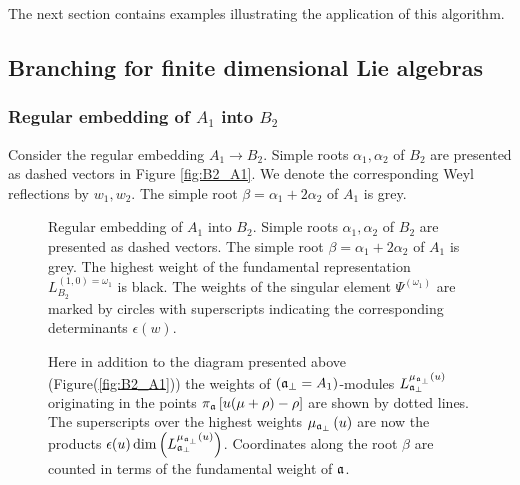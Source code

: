 The next section contains examples illustrating the application of this
algorithm.

\subsection{Branching for finite dimensional Lie algebras}
\label{sec:finite-dimens-lie}

\subsubsection{Regular embedding of $A_1$ into $B_2$}
\label{sec:regul-embedd-a_1}

Consider the regular embedding $A_1\to B_2$. Simple roots $\alpha_1, \alpha_2$ of $B_2$
are presented as dashed vectors in Figure \ref{fig:B2_A1}. We denote the corresponding
Weyl reflections by $w_1, w_2$. The simple root $\beta = \alpha_1+2\alpha_2$ of $A_1$ is
grey.


\begin{figure}[p]
  \noindent{}
  \caption{Regular embedding of $A_1$ into $B_2$. Simple roots $\alpha_1, \alpha_2$ of $B_2$
  are presented as dashed vectors.
  The simple root $\beta = \alpha_1+2\alpha_2$ of $A_1$ is grey.
  The highest weight of the fundamental representation $L^{(1,0)=\omega_1}_{B_2}$ is black.
  The weights of the singular element $\Psi^{(\omega_1)}$ are marked by circles with
  superscripts indicating the corresponding determinants $\epsilon(w)$.}
  \label{fig:B2_A1}

  \noindent{}
  \caption{Here in addition to the diagram presented above (Figure(\ref{fig:B2_A1}))
  the weights of $\left( \mathfrak{a}_{\bot}=A_1 \right)$-modules $L_{\mathfrak{a}_{\perp }}^{\mu_{\mathfrak{a}_{\perp }}\left( u\right) }$
  originating in the points $\pi _{\mathfrak{a}}\left[ u(\mu +\rho )-\rho \right] $
are shown by dotted lines.
    The superscripts over the highest weights  $\mu_{\mathfrak{a}_{\perp }}\left( u\right)$
    are now the products $\epsilon(u)\dim\left(L_{\mathfrak{a}_{\perp }}^{\mu_{\mathfrak{a}_{\perp }}\left( u\right) }\right)$.
    Coordinates along the root $\beta$ are counted in terms of the fundamental weight of $\mathfrak{a}$. }
\label{fig:B2_A1_2}
\end{figure}


